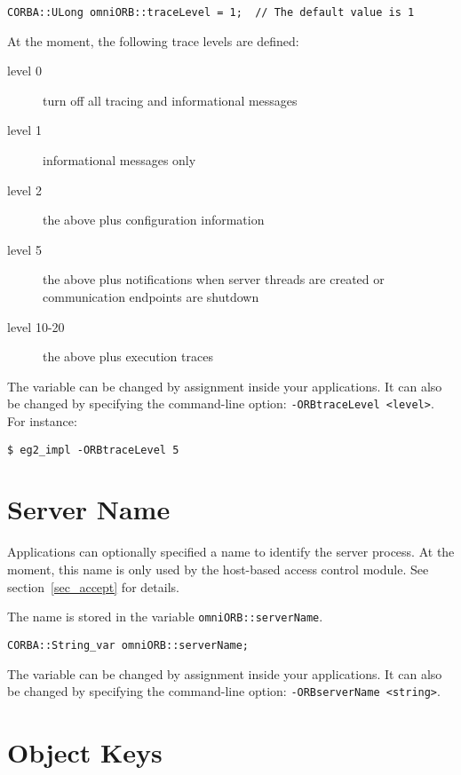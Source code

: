 \documentclass[11pt,twoside,onecolumn]{book}
\begin{document}
{\small
\begin{verbatim}
CORBA::ULong omniORB::traceLevel = 1;  // The default value is 1
\end{verbatim}
}

At the moment, the following trace levels are defined:

\begin{description}

\item[level 0] turn off all tracing and informational messages
\item[level 1] informational messages only
\item[level 2] the above plus configuration information
\item[level 5] the above plus notifications when server threads are created
or communication endpoints are shutdown
\item[level 10-20] the above plus execution traces

\end{description}

The variable can be changed by assignment inside your applications. It can
also be changed by specifying the command-line option: {\tt -ORBtraceLevel
<level>}. For instance:

{\small
\begin{verbatim}
$ eg2_impl -ORBtraceLevel 5
\end{verbatim}
}


\section{Server Name}
\label{sec_servername}

Applications can optionally specified a name to identify the server
process. At the moment, this name is only used by the host-based access
control module. See section~\ref{sec_accept} for details.

The name is stored in the variable {\tt omniORB::serverName}.

{\small
\begin{verbatim}
CORBA::String_var omniORB::serverName;
\end{verbatim}
}

The variable can be changed by assignment inside your applications. It can
also be changed by specifying the command-line option: {\tt -ORBserverName
<string>}.
 
\section{Object Keys}
\end{document}
